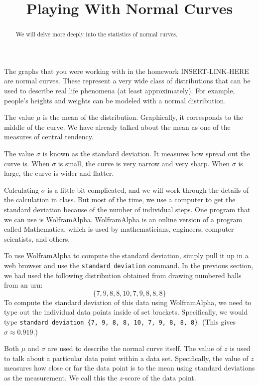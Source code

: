 \documentclass{ximera}
\title{Playing With Normal Curves}
\begin{document}
\begin{abstract}
We will delve more deeply into the statistics of normal curves.
\end{abstract}
\maketitle

The graphs that you were working with in the homework INSERT-LINK-HERE are normal curves.  These represent a very wide class of distributions that can be used to describe real life phenomena (at least approximately). For example, people's heights and weights can be modeled with a normal distribution.

The value $\mu$ is the mean of the distribution. Graphically, it corresponds to the middle of the curve. We have already talked about the mean as one of the measures of central tendency.

The value $\sigma$ is known as the standard deviation. It measures how spread out the curve is. When $\sigma$ is small, the curve is very narrow and very sharp. When $\sigma$ is large, the curve is wider and flatter.

Calculating $\sigma$ is a little bit complicated, and we will work through the details of the calculation in class. But most of the time, we use a computer to get the standard deviation because of the number of individual steps. One program that we can use is WolframAlpha. WolframAlpha is an online version of a program called Mathematica, which is used by mathematicians, engineers, computer scientists, and others.

To use WolframAlpha to compute the standard deviation, simply pull it up in a web browser and use the \verb|standard deviation| command. In the previous section, we had used the following distribution obtained from drawing numbered balls from an urn:
\[ \{ 7, 9, 8, 8, 10, 7, 9, 8, 8, 8 \} \]
To compute the standard deviation of this data using WolframAlpha, we need to type out the individual data points inside of set brackets. Specifically, we would type \verb|standard deviation {7, 9, 8, 8, 10, 7, 9, 8, 8, 8}|. (This gives $\sigma \approx 0.919$.)

Both $\mu$ and $\sigma$ are used to describe the normal curve itself. The value of $z$ is used to talk about a particular data point within a data set. Specifically, the value of $z$ measures how close or far the data point is to the mean using standard deviations as the measurement. We call this the $z$-score of the data point.
\end{document}
